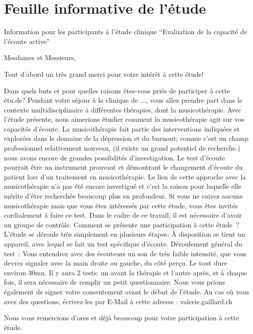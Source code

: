 \section{Feuille informative de l'étude}

Information pour les participants à l'étude clinique
\foreignquote{french}{Evaluation de la capacité de l'écoute active}


Mesdames et Messieurs,

Tout d'abord un très grand merci pour votre intérêt à cette étude!

Dans quels buts et pour quelles raisons êtes-vous priés de 
par\-ti\-ci\-per à cet\-te étu\-.de?
Pendant votre séjour à la clinique de ..., vous allez prendre
part dans le contexte multidisciplinaire à différentes thérapies, dont
la musicothérapie. Avec l'étude présente, nous aimerions étudier comment
la musicothérapie agit sur vos capacités d'écoute.
La musicothérapie fait partie des interventions indiquées et explorées dans le domaine
de la dépression et du burnout; comme c'est un champ
professionnel
relativement nouveau, (il existe un grand potentiel de recherche.) nous avons encore de grandes 
possibilités d'investigation.
Le test d'écoute pourrait être un instrument prouvant et démontrant le changement
d'écoute du patient lors d'un traitement en musicothérapie.
Le lien de cette approche avec la musicothérapie n'a pas été encore
investigué et c'est la raison pour laquelle elle mérite d'être
recherchée beaucoup plus en profondeur.
Si vous ne suivez aucune musicothérapie mais que vous êtes intéressés
par cette étude, vous êtes invités cordialement à faire ce test. Dans
le cadre de ce travail, il est nécessaire d'avoir un groupe de contrôle.
Comment se présente une participation à cette étude ?
L'étude se déroule très simplement en plusieurs étapes:
À disposition se tient un appareil, avec lequel se fait un test spécifique d'écoute.
Déroulement général du test :
Vous entendrez  avec des écouteurs un son de très faible intensité, que
vous devrez signaler avec la main droite ou gauche, du côté
perçu.
Le tout dure environ 30mn.
Il y aura 2 tests: un avant la thérapie et l'autre après, et à chaque
fois, il sera nécessaire de remplir un petit questionnaire.
Nous vous prions également de signer votre consentement avant le début
de l'étude.
Au cas où vous avez des questions, écrivez-les par E-Mail à cette adresse : valerie.gaillard\@gmx.ch

Nous vous remercions d'ores et déjà beaucoup pour votre participation
à cette étude.

